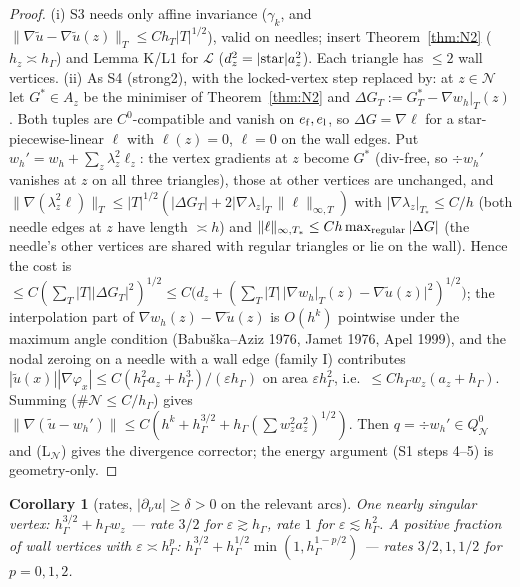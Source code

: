 \documentclass[11pt]{article}
\newtheorem{corollary}[theorem]{Corollary}
\theoremstyle{remark}
\newcommand{\hG}{h_\Gamma}
\newcommand{\dn}{\partial_\nu}
\newcommand{\norm}[1]{\|#1\|}
\newcommand{\Nset}{\mathcal N}
\newcommand{\Lk}{\mathcal L}
\begin{document}
\begin{proof}
(i) S3 needs only affine invariance ($\gamma_k$, and $\norm{\nabla\tilde u-\nabla\tilde u(z)}_T\le Ch_T|T|^{1/2}$), valid on needles; insert
Theorem~\ref{thm:N2} ($h_z\asymp\hG$) and Lemma K/L1 for $\Lk$ ($d_z^2=|{\rm star}|a_z^2$). Each triangle has $\le2$ wall vertices.
(ii) As S4 (strong2), with the locked-vertex step replaced by: at $z\in\Nset$ let $G^*\in A_z$ be the minimiser of Theorem~\ref{thm:N2}
and $\Delta G_T:=G^*_T-\nabla w_h|_T(z)$. Both tuples are $C^0$-compatible and vanish on $e_{\rm f},e_{\rm l}$, so $\Delta G=\nabla\ell$ for a
star-piecewise-linear $\ell$ with $\ell(z)=0$, $\ell=0$ on the wall edges. Put $w_h'=w_h+\sum_z\lambda_z^2\ell_z$: the vertex gradients at $z$
become $G^*$ (div-free, so $\div w_h'$ vanishes at $z$ on all three triangles), those at other vertices are unchanged, and
$\norm{\nabla(\lambda_z^2\ell)}_{T}\le|T|^{1/2}(|\Delta G_T|+2|\nabla\lambda_z|_T\,\norm{\ell}_{\infty,T})$ with
$|\nabla\lambda_z|_{T_*}\le C/h$ (both needle edges at $z$ have length $\asymp h$) and $\norm\ell_{\infty,T_*}\le Ch\max_{\rm regular}|\Delta G|$
(the needle's other vertices are shared with regular triangles or lie on the wall). Hence the cost is $\le C(\sum_T|T||\Delta G_T|^2)^{1/2}
\le C\big(d_z+(\sum_T|T|\,|\nabla w_h|_T(z)-\nabla\tilde u(z)|^2)^{1/2}\big)$; the interpolation part of $\nabla w_h(z)-\nabla\tilde u(z)$ is $O(h^k)$ pointwise under the
maximum angle condition (Babu\v ska--Aziz 1976, Jamet 1976, Apel 1999), and the nodal zeroing on a needle with a wall edge (family I)
contributes $|\tilde u(x)||\nabla\varphi_x|\le C(\hG^2a_z+\hG^3)/(\varepsilon\hG)$ on area $\varepsilon\hG^2$, i.e.\ $\le C\hG w_z(a_z+\hG)$.
Summing ($\#\Nset\le C/\hG$) gives $\norm{\nabla(\tilde u-w_h')}\le C(h^k+\hG^{3/2}+\hG(\sum w_z^2a_z^2)^{1/2})$. Then
$q=\div w_h'\in Q^0_\Nset$ and (L$_\Nset$) gives the divergence corrector; the energy argument (S1 steps 4--5) is geometry-only.
\end{proof}
\begin{corollary}[rates, $|\dn u|\ge\delta>0$ on the relevant arcs]
One nearly singular vertex: $\hG^{3/2}+\hG w_z$ --- rate $3/2$ for $\varepsilon\gtrsim\hG$, rate $1$ for $\varepsilon\lesssim\hG^2$.
A positive fraction of wall vertices with $\varepsilon\asymp\hG^p$: $\hG^{3/2}+\hG^{1/2}\min(1,\hG^{1-p/2})$ --- rates $3/2,1,1/2$ for $p=0,1,2$.
\end{corollary}
\end{document}
